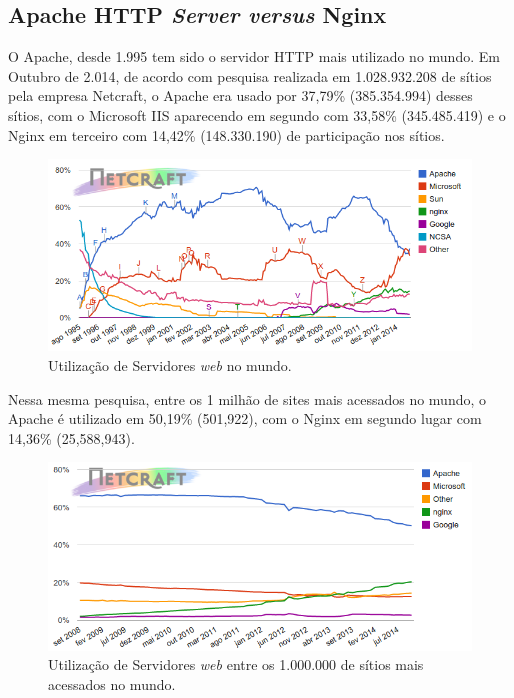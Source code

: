\subsection{Apache HTTP \textit{Server versus} Nginx}
O Apache, desde 1.995 tem sido o servidor HTTP mais utilizado no mundo. Em Outubro de 2.014, de acordo com pesquisa realizada em 1.028.932.208 de sítios pela empresa Netcraft, o Apache era usado por 37,79\% (385.354.994) desses sítios, com o Microsoft IIS aparecendo em segundo com 33,58\% (345.485.419) e o Nginx em terceiro com 14,42\% (148.330.190) de participação nos sítios.\\

\begin{figure}[h!]
	\centering
	\includegraphics[scale=0.5]{figuras/grafico1}  
	\caption{Utilização de Servidores \textit{web} no mundo.}
	\label{fig:webservers-utilizacao}
\end{figure}

Nessa mesma pesquisa, entre os 1 milhão de sites mais acessados no mundo, o Apache é utilizado em 50,19\% (501,922), com o Nginx em segundo lugar com 14,36\% (25,588,943).\\

\begin{figure}[h!]
	\centering
	\includegraphics[scale=0.5]{figuras/grafico2} 
	\caption{Utilização de Servidores \textit{web} entre os 1.000.000 de sítios mais acessados no mundo.}
	\label{fig:webservers-utilizacao-milhao}
\end{figure}


